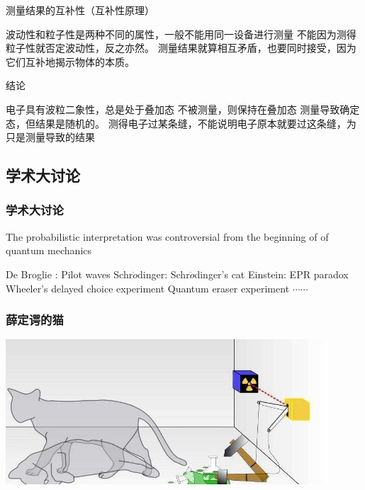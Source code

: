  \begin{frame}   
     \begin{enumerate}
         \Item 测量结果的互补性（互补性原理）\\
         \begin{itemize}
             \IItem 波动性和粒子性是两种不同的属性，一般不能用同一设备进行测量
             \IItem 不能因为测得粒子性就否定波动性，反之亦然。
             \IItem 测量结果就算相互矛盾，也要同时接受，因为它们互补地揭示物体的本质。
         \end{itemize}
         \Item 结论
         \begin{itemize}
             \IItem 电子具有波粒二象性，总是处于叠加态
             \IItem 不被测量，则保持在叠加态
             \IItem 测量导致确定态，但结果是随机的。
             \IItem 测得电子过某条缝，不能说明电子原本就要过这条缝，为只是测量导致的结果
         \end{itemize}
     \end{enumerate}
 \end{frame}
 
 \subsection{学术大讨论}
 \begin{frame}
     \frametitle{学术大讨论}
     The probabilistic interpretation was controversial from the beginning of of quantum mechanics
     \begin{tcolorbox4}
     \begin{itemize}
         \Item De Broglie : Pilot waves
         \Item Schr$\ddot{o}$dinger: Schr$\ddot{o}$dinger's cat
         \Item Einstein: EPR paradox
         \Item Wheeler's delayed choice experiment
         \Item Quantum eraser experiment
         \Item $\cdots \cdots$
     \end{itemize}
     \end{tcolorbox4}
 \end{frame}
 
 \begin{frame}
     \frametitle{薛定谔的猫}
     \begin{center}
         \includegraphics[width=0.9\textwidth]{figs/2022-03-04-13-49-09.png} \\
     \end{center} 
 \end{frame}
 
